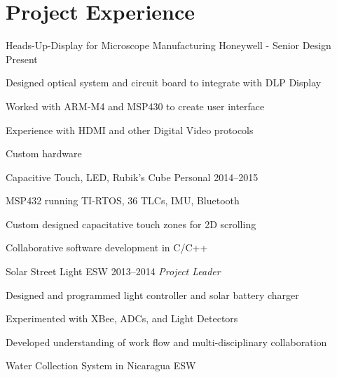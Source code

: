 \documentclass[]{friggeri-cv} %
\begin{document}

\section{\sc Project Experience}
\begin{entrylist}
\entryFourItem
{Heads-Up-Display for Microscope Manufacturing}
{Honeywell - Senior Design}
{Present}
{\begin{itemizenosep}
	\item Designed optical system and circuit board to integrate with DLP Display
	\item Worked with ARM-M4 and MSP430 to create user interface
	\item Experience with HDMI and other Digital Video protocols
	\item Custom hardware 
\end{itemizenosep}}
\entryFourItem
{Capacitive Touch, LED, Rubik's Cube}
{Personal}
{2014--2015}
{\begin{itemizenosep}
	\item MSP432 running TI-RTOS, 36 TLCs, IMU, Bluetooth
	\item Custom designed capacitative touch zones for 2D scrolling
	\item Collaborative software development in C/C++ 
\end{itemizenosep}}
\entry
{Solar Street Light}
{ESW}
{2013--2014}
{\emph{Project Leader}}
{\begin{itemizenosep}
	\item Designed and programmed light controller and solar battery charger
	\item Experimented with XBee, ADCs, and Light Detectors
	\item Developed understanding of work flow and multi-disciplinary collaboration
\end{itemizenosep}}
\entry
{Water Collection System in Nicaragua}
{ESW}

\end{entrylist}
\end{document}
